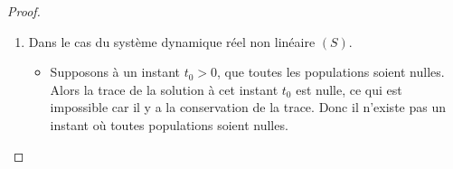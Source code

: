 \documentclass[12pt,a4paper,openany,oneside]{book}
\begin{document}
{{{{{{\begin{proof}
\begin{enumerate}
\begin{itemize}[label=$\bullet$]
\item Supposons à un instant $t_{0}\geq0$, qu'au moins deux populations soient égales de 1 .Alors 
$$ \sum_{j=1}^{3}U_{j}(t_{0})\geq 2 $$
Ce qui contredit la conservation de la trace.\\
Donc il est impossible d'avoir un temps $t_{0}\geq0$ où au moins deux populations soient égales de 1.

\item Supposons qu'il existe à un instant $t_{0}\geq0$, où exactement une des populations soit égale de 1. Alors les autres populations sont nulles.
Cette hypothèse est absurde car ce temps $t_{0}\geq0$  où toutes les populations soient nulles sauf l'une d'entre elles n'existe pas (cas traité précédemment à savoir $ U_{i}(t_{0})\neq 0 $ et $\forall j\neq i, U_{j}(t_{0})=0 , i, j \in \{1;2;3\} $). 
\end{itemize}
\textbf{Partiellement, nous pouvons conclure que dans le cas du modèle linéaire il n'existe pas un temps $t_{0}\geq0$ où au moins une des populations peut être nulle ou égale à 1 .}
 
 \item Dans le cas du système dynamique réel non linéaire $(S)$.
 \begin{itemize}[label=$\bullet$]
 \item Supposons à un instant $t_{0}>0$, que toutes les populations soient nulles.\\ 
 Alors la trace de la solution à cet instant $t_{0}$ est nulle, ce qui est impossible
 car il y a la conservation de la trace. Donc il n'existe pas un instant où toutes populations soient nulles.


\end{itemize}
\end{enumerate}
\end{proof}}}}}}}
\end{document}
